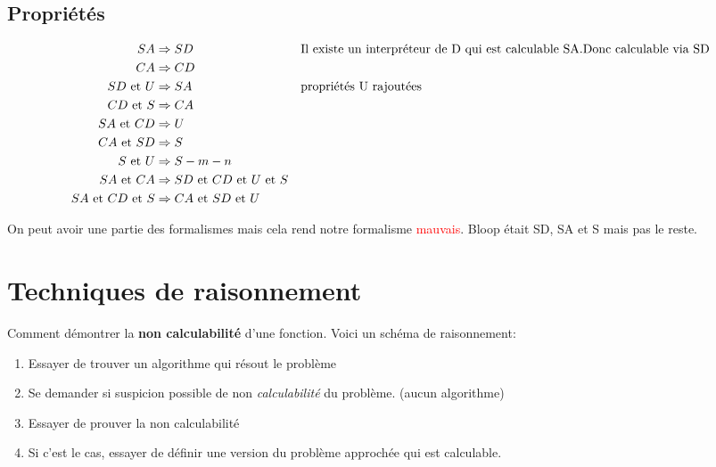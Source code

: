 \documentclass{report}
\begin{document}
\subsection{Propriétés}
\begin{align*}
SA & \Rightarrow SD & &\text{Il existe un interpréteur de D qui est calculable SA.\linebreak Donc calculable via SD}\\
CA & \Rightarrow CD & &\\
SD \text{ et } U &\Rightarrow SA & &\text{propriétés U rajoutées}\\
CD \text{ et } S &\Rightarrow CA & & \\
SA \text{ et } CD &\Rightarrow U & & \\
CA \text{ et } SD &\Rightarrow S & & \\
S \text{ et } U &\Rightarrow S-m-n & & \\
SA \text{ et } CA &\Rightarrow SD \text{ et } CD \text{ et } U \text{ et } S & & \\ 
SA \text{ et } CD \text{ et } S &\Rightarrow CA \text{ et } SD \text{ et } U & &    
\end{align*}

On peut avoir une partie des formalismes mais cela rend notre formalisme \textcolor{red}{mauvais}. Bloop était SD, SA et S mais pas le reste.

\section{Techniques de raisonnement}
Comment démontrer la \textbf{non calculabilité} d'une fonction. Voici un schéma de raisonnement:
\begin{enumerate}
	\item Essayer de trouver un algorithme qui résout le problème 
	\item Se demander si suspicion possible de non \textit{calculabilité} du problème. (aucun algorithme)
	\item Essayer de prouver la non calculabilité
	\item Si c'est le cas, essayer de définir une version du problème approchée qui est calculable.
\end{enumerate}
\end{document}

